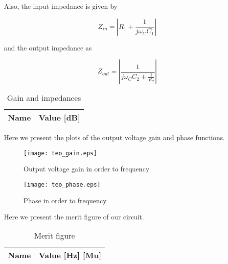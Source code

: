 Also, the input impedance is given by

\begin{equation} \label{eq6}
Z_{in}=|R_1 + \frac{1}{j \omega_C C_1}|
\end{equation}

and the output impedance as

\begin{equation} \label{eq7}
Z_{out}=|\frac{1}{j \omega_C C_2+\frac{1}{R_2}}|
\end{equation}

\begin{table}[h]
  \centering
  \begin{tabular}{|l|r|}
    \hline    
    {\bf Name} & {\bf Value [dB]} \\ \hline
    
  \end{tabular}
  \caption{Gain and impedances}
  \label{tab:data2}
\end{table}
\FloatBarrier

Here we present the plots of the output voltage gain and phase functions.

\begin{figure}[h] \centering
\texttt{[image: teo\_gain.eps]}
\caption{Output voltage gain in order to frequency}
\label{fig:gain}
\end{figure}
\FloatBarrier

\begin{figure}[h] \centering
\texttt{[image: teo\_phase.eps]}
\caption{Phase in order to frequency}
\label{fig:phase}
\end{figure}
\FloatBarrier

Here we present the merit figure of our circuit.

\begin{table}[h]
  \centering
  \begin{tabular}{|l|r|}
    \hline    
    {\bf Name} & {\bf Value [Hz] [Mu]} \\ \hline
    
  \end{tabular}
  \caption{Merit figure}
  \label{tab:data3}
\end{table}
\FloatBarrier



